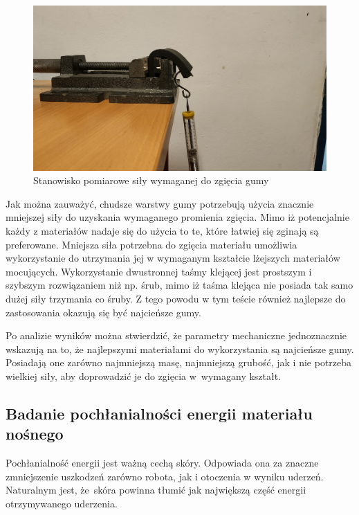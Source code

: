 \begin{figure}[!h]
    \centering 
    \includegraphics[width=0.9\linewidth]{img/badanie_gietkosc.jpg}
    \caption{Stanowisko pomiarowe siły wymaganej do zgięcia gumy}
    \label{f_badanie_2_giecie}
\end{figure}



Jak można zauważyć, chudsze warstwy gumy potrzebują użycia znacznie mniejszej siły do uzyskania wymaganego promienia zgięcia. Mimo iż potencjalnie każdy z materiałów nadaje się do użycia to te, które łatwiej się zginają są preferowane. Mniejsza siła potrzebna do zgięcia materiału umożliwia wykorzystanie do utrzymania jej w wymaganym kształcie lżejszych materiałów mocujących. Wykorzystanie dwustronnej taśmy klejącej jest prostszym i szybszym rozwiązaniem niż np. śrub, mimo iż taśma klejąca nie posiada tak samo dużej siły trzymania co śruby. Z tego powodu w tym teście również najlepsze do zastosowania okazują się być najcieńsze gumy.

Po analizie wyników można stwierdzić, że parametry mechaniczne jednoznacznie wskazują na to, że najlepszymi materiałami do wykorzystania są najcieńsze gumy. Posiadają one zarówno najmniejszą masę, najmniejszą grubość, jak i nie potrzeba wielkiej siły, aby doprowadzić je do zgięcia w~wymagany kształt.

\subsection{Badanie pochłanialności energii materiału nośnego}

Pochłanialność energii jest ważną cechą skóry. Odpowiada ona za znaczne zmniejszenie uszkodzeń zarówno robota, jak i otoczenia w wyniku uderzeń. Naturalnym jest, że~skóra powinna tłumić jak największą część energii otrzymywanego uderzenia.

